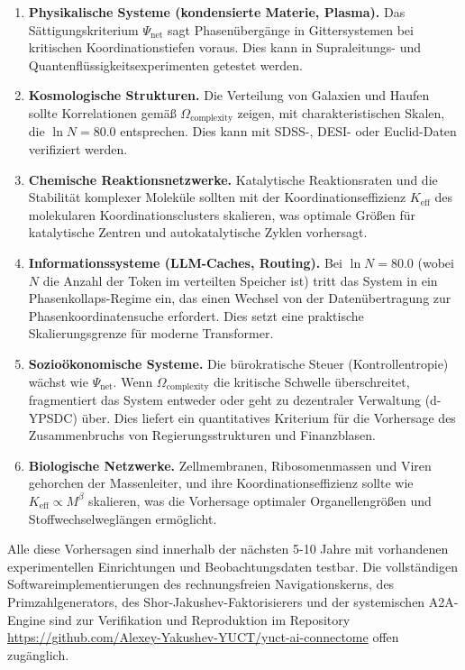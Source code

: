 \documentclass[12pt,a4paper]{article}
\theoremstyle{remark}
\newcommand{\Keff}{K_{\mathrm{eff}}}
\begin{document}
	\begin{enumerate}[label=(\arabic*)]
		\item \textbf{Physikalische Systeme (kondensierte Materie, Plasma).} Das
		Sättigungskriterium \(\Psi_{\mathrm{net}}\) sagt Phasenübergänge in
		Gittersystemen bei kritischen Koordinationstiefen voraus. Dies kann in
		Supraleitungs- und Quantenflüssigkeitsexperimenten getestet werden.
		\item \textbf{Kosmologische Strukturen.} Die Verteilung von Galaxien und
		Haufen sollte Korrelationen gemäß \(\Omega_{\mathrm{complexity}}\) zeigen,
		mit charakteristischen Skalen, die \(\ln N = 80.0\) entsprechen. Dies kann
		mit SDSS-, DESI- oder Euclid-Daten verifiziert werden.
		\item \textbf{Chemische Reaktionsnetzwerke.} Katalytische Reaktionsraten und
		die Stabilität komplexer Moleküle sollten mit der Koordinationseffizienz
		\(\Keff\) des molekularen Koordinationsclusters skalieren, was optimale
		Größen für katalytische Zentren und autokatalytische Zyklen vorhersagt.
		\item \textbf{Informationssysteme (LLM-Caches, Routing).} Bei \(\ln N = 80.0\)
		(wobei \(N\) die Anzahl der Token im verteilten Speicher ist) tritt das
		System in ein Phasenkollaps-Regime ein, das einen Wechsel von der
		Datenübertragung zur Phasenkoordinatensuche erfordert. Dies setzt eine
		praktische Skalierungsgrenze für moderne Transformer.
		\item \textbf{Sozioökonomische Systeme.} Die bürokratische Steuer
		(Kontrollentropie) wächst wie \(\Psi_{\mathrm{net}}\). Wenn
		\(\Omega_{\mathrm{complexity}}\) die kritische Schwelle überschreitet,
		fragmentiert das System entweder oder geht zu dezentraler Verwaltung
		(d-YPSDC) über. Dies liefert ein quantitatives Kriterium für die Vorhersage
		des Zusammenbruchs von Regierungsstrukturen und Finanzblasen.
		\item \textbf{Biologische Netzwerke.} Zellmembranen, Ribosomenmassen und
		Viren gehorchen der Massenleiter, und ihre Koordinationseffizienz sollte
		wie \(\Keff \propto M^{\beta}\) skalieren, was die Vorhersage optimaler
		Organellengrößen und Stoffwechselweglängen ermöglicht.
	\end{enumerate}
	
	Alle diese Vorhersagen sind innerhalb der nächsten 5-10 Jahre mit vorhandenen
	experimentellen Einrichtungen und Beobachtungsdaten testbar. Die vollständigen
	Softwareimplementierungen des rechnungsfreien Navigationskerns, des
	Primzahlgenerators, des Shor-Jakushev-Faktorisierers und der systemischen
	A2A-Engine sind zur Verifikation und Reproduktion im Repository
	\url{https://github.com/Alexey-Yakushev-YUCT/yuct-ai-connectome} offen
	zugänglich.
	
\end{document}
